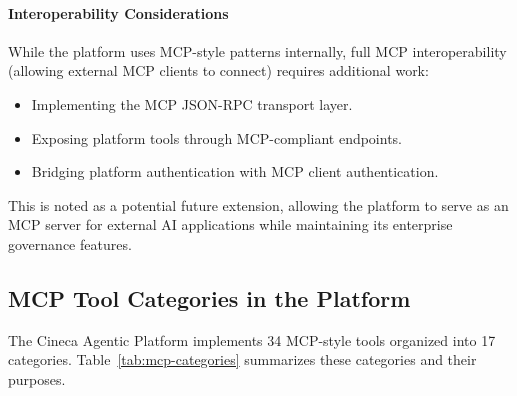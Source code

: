 \paragraph{Interoperability Considerations}

While the platform uses MCP-style patterns internally, full MCP interoperability (allowing external MCP clients to connect) requires additional work:
\begin{itemize}
    \item Implementing the MCP JSON-RPC transport layer.
    \item Exposing platform tools through MCP-compliant endpoints.
    \item Bridging platform authentication with MCP client authentication.
\end{itemize}

This is noted as a potential future extension, allowing the platform to serve as an MCP server for external AI applications while maintaining its enterprise governance features.

\subsection{MCP Tool Categories in the Platform}

The Cineca Agentic Platform implements 34 MCP-style tools organized into 17 categories. Table~\ref{tab:mcp-categories} summarizes these categories and their purposes.

